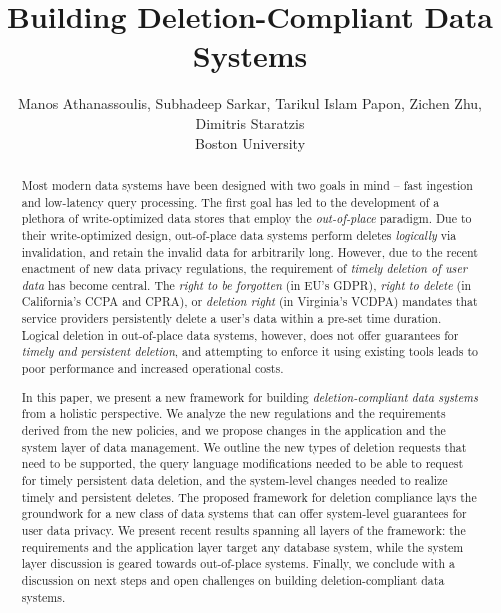 \documentclass[11pt,dvipdfmx]{article}
\begin{document}
\title{Building Deletion-Compliant Data Systems}


\author{
Manos Athanassoulis, Subhadeep Sarkar, Tarikul Islam Papon, Zichen Zhu, Dimitris Staratzis
\medskip\\
Boston University
}



\maketitle


\begin{abstract}
Most modern data systems have been designed with two goals in mind -- fast ingestion and 
low-latency query processing. The first goal has led to the development of a plethora of 
write-optimized data stores that employ the \textit{out-of-place} paradigm. 
Due to their write-optimized design, out-of-place data systems perform deletes 
\textit{logically} via invalidation, and retain the invalid data for arbitrarily long. 
However, due to the recent enactment of new data privacy regulations, 
the requirement of \textit{timely deletion of user data} has become central. 
The \textit{right to be 
forgotten} (in EU's GDPR), \textit{right to delete} (in California's CCPA and CPRA), or 
\textit{deletion right} (in Virginia's VCDPA) mandates that service providers persistently delete a user's data within a pre-set time duration. 
Logical deletion in out-of-place data systems, however, does not offer guarantees for 
\textit{timely and persistent deletion}, and attempting to enforce it using existing tools 
leads to poor performance and increased operational costs. 

\hspace{0.02in} In this paper, we present a new framework for building \textit{deletion-compliant
data systems} from a holistic perspective. We analyze the new regulations and the 
requirements derived from the new policies, and we propose changes in the application and
the system layer of data management. We outline the new types of deletion requests that need to be supported, the query language
modifications needed to be able to request for timely persistent data deletion, and the system-level 
changes needed to realize timely and persistent deletes. 
The proposed framework for deletion compliance lays the groundwork for a new class of data 
systems that can offer system-level guarantees for user data privacy. We present recent results 
spanning all layers of the framework: the requirements and
the application layer target any database system, while the system layer discussion is geared 
towards out-of-place systems. Finally, we conclude with a discussion on next steps
and open challenges on building deletion-compliant data systems.

\end{abstract}
\end{document}
